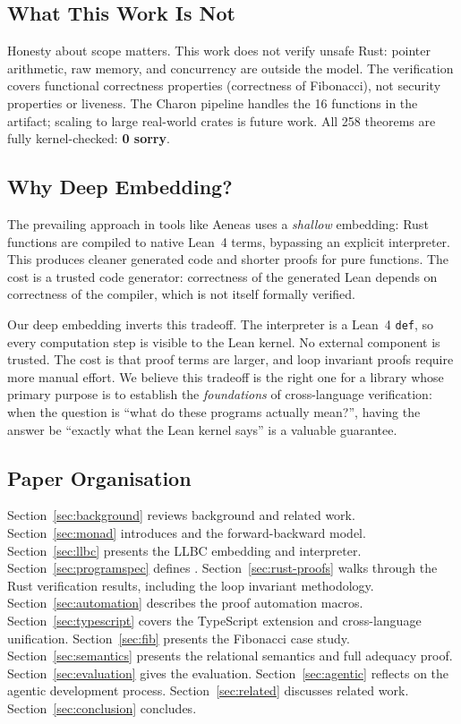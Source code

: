 \subsection{What This Work Is Not}

Honesty about scope matters. This work does not verify unsafe Rust: pointer
arithmetic, raw memory, and concurrency are outside the model.
The verification covers functional correctness properties (\eg correctness of
Fibonacci), not security properties or liveness.
The Charon pipeline handles the 16 functions in the artifact; scaling to large
real-world crates is future work.
All 258 theorems are fully kernel-checked: \textbf{0 sorry}.

\subsection{Why Deep Embedding?}

The prevailing approach in tools like Aeneas uses a \emph{shallow} embedding:
Rust functions are compiled to native Lean~4 terms, bypassing an explicit
interpreter. This produces cleaner generated code and shorter proofs for pure
functions. The cost is a trusted code generator: correctness of the generated
Lean depends on correctness of the compiler, which is not itself formally
verified.

Our deep embedding inverts this tradeoff. The interpreter is a Lean~4 \texttt{def},
so every computation step is visible to the Lean kernel. No external component
is trusted. The cost is that proof terms are larger, and loop invariant proofs
require more manual effort. We believe this tradeoff is the right one for a
library whose primary purpose is to establish the \emph{foundations} of
cross-language verification: when the question is ``what do these programs
actually mean?'', having the answer be ``exactly what the Lean kernel says''
is a valuable guarantee.

\subsection{Paper Organisation}

Section~\ref{sec:background} reviews background and related work.
Section~\ref{sec:monad} introduces \RustM and the forward-backward model.
Section~\ref{sec:llbc} presents the LLBC embedding and interpreter.
Section~\ref{sec:programspec} defines \ProgramSpec.
Section~\ref{sec:rust-proofs} walks through the Rust verification results,
including the loop invariant methodology.
Section~\ref{sec:automation} describes the proof automation macros.
Section~\ref{sec:typescript} covers the TypeScript extension and
cross-language unification.
Section~\ref{sec:fib} presents the Fibonacci case study.
Section~\ref{sec:semantics} presents the relational semantics and full adequacy proof.
Section~\ref{sec:evaluation} gives the evaluation.
Section~\ref{sec:agentic} reflects on the agentic development process.
Section~\ref{sec:related} discusses related work.
Section~\ref{sec:conclusion} concludes.
